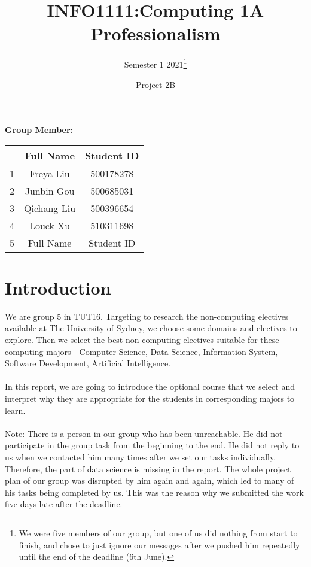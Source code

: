 \documentclass{article}
\title{INFO1111:Computing 1A Professionalism}
\author{Semester 1 2021\thanks{We were five members of our group, but one of us did nothing from start to finish, and chose to just ignore our messages after we pushed him repeatedly until the end of the deadline (6th June).}}
\date{Project 2B}
\begin{document}
	
	
	\begin{titlepage}
		\maketitle
		\begin{title}
			\begin{center}
				\textbf{Group Member:}
			\end{center}
		\end{title}
		\begin{center}
			
			\begin{tabular}{|c|c|c|}
				\hline &Full Name& Student ID\\
				\hline 1& Freya Liu & 500178278  \\
				\hline 2& Junbin Gou & 500685031  \\
				\hline 3& Qichang Liu & 500396654 \\
				\hline 4& Louck Xu & 510311698  \\
				\hline 5&Full Name& Student ID  \\
				\hline
			\end{tabular}
		\end{center}
	\end{titlepage}
	
	\section{Introduction}
	We are group 5 in TUT16. Targeting to research the non-computing electives available at The University of Sydney, we choose some domains and electives to explore. Then we select the best non-computing electives suitable for these computing majors - Computer Science, Data Science, Information System, Software Development, Artificial Intelligence. \\
	\\
	In this report, we are going to introduce the optional course that we select and interpret why they are appropriate for the students in corresponding majors to learn.\\
	\\
	Note: There is a person in our group who has been unreachable. He did not participate in the group task from the beginning to the end. He did not reply to us when we contacted him many times after we set our tasks individually. Therefore, the part of data science is missing in the report. The whole project plan of our group was disrupted by him again and again, which led to many of his tasks being completed by us. This was the reason why we submitted the work five days late after the deadline.
	
\end{document}
